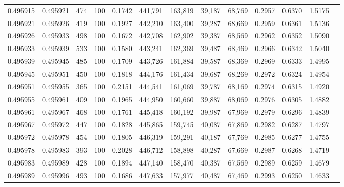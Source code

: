 \begin{tabular}{rrrrrrrrrrrrr}
0.495915 & 0.495921 &   474 & 100 &                                     0.1742 & 441,791 & 163,819 &  39,187 &  68,769 & 0.2957 & 0.6370 & 1.5175 \\
0.495921 & 0.495926 &   419 & 100 &                                     0.1927 & 442,210 & 163,400 &  39,287 &  68,669 & 0.2959 & 0.6361 & 1.5136 \\
0.495926 & 0.495933 &   498 & 100 &                                     0.1672 & 442,708 & 162,902 &  39,387 &  68,569 & 0.2962 & 0.6352 & 1.5090 \\
0.495933 & 0.495939 &   533 & 100 &                                     0.1580 & 443,241 & 162,369 &  39,487 &  68,469 & 0.2966 & 0.6342 & 1.5040 \\
0.495939 & 0.495945 &   485 & 100 &                                     0.1709 & 443,726 & 161,884 &  39,587 &  68,369 & 0.2969 & 0.6333 & 1.4995 \\
0.495945 & 0.495951 &   450 & 100 &                                     0.1818 & 444,176 & 161,434 &  39,687 &  68,269 & 0.2972 & 0.6324 & 1.4954 \\
0.495951 & 0.495955 &   365 & 100 &                                     0.2151 & 444,541 & 161,069 &  39,787 &  68,169 & 0.2974 & 0.6315 & 1.4920 \\
0.495955 & 0.495961 &   409 & 100 &                                     0.1965 & 444,950 & 160,660 &  39,887 &  68,069 & 0.2976 & 0.6305 & 1.4882 \\
0.495961 & 0.495967 &   468 & 100 &                                     0.1761 & 445,418 & 160,192 &  39,987 &  67,969 & 0.2979 & 0.6296 & 1.4839 \\
0.495967 & 0.495972 &   447 & 100 &                                     0.1828 & 445,865 & 159,745 &  40,087 &  67,869 & 0.2982 & 0.6287 & 1.4797 \\
0.495972 & 0.495978 &   454 & 100 &                                     0.1805 & 446,319 & 159,291 &  40,187 &  67,769 & 0.2985 & 0.6277 & 1.4755 \\
0.495978 & 0.495983 &   393 & 100 &                                     0.2028 & 446,712 & 158,898 &  40,287 &  67,669 & 0.2987 & 0.6268 & 1.4719 \\
0.495983 & 0.495989 &   428 & 100 &                                     0.1894 & 447,140 & 158,470 &  40,387 &  67,569 & 0.2989 & 0.6259 & 1.4679 \\
0.495989 & 0.495996 &   493 & 100 &                                     0.1686 & 447,633 & 157,977 &  40,487 &  67,469 & 0.2993 & 0.6250 & 1.4633 \\

\end{tabular}
